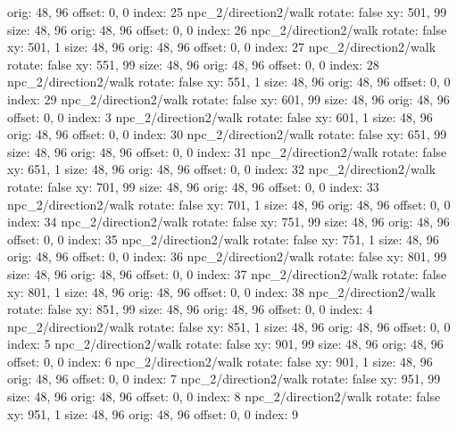   orig: 48, 96
  offset: 0, 0
  index: 25
npc_2/direction2/walk
  rotate: false
  xy: 501, 99
  size: 48, 96
  orig: 48, 96
  offset: 0, 0
  index: 26
npc_2/direction2/walk
  rotate: false
  xy: 501, 1
  size: 48, 96
  orig: 48, 96
  offset: 0, 0
  index: 27
npc_2/direction2/walk
  rotate: false
  xy: 551, 99
  size: 48, 96
  orig: 48, 96
  offset: 0, 0
  index: 28
npc_2/direction2/walk
  rotate: false
  xy: 551, 1
  size: 48, 96
  orig: 48, 96
  offset: 0, 0
  index: 29
npc_2/direction2/walk
  rotate: false
  xy: 601, 99
  size: 48, 96
  orig: 48, 96
  offset: 0, 0
  index: 3
npc_2/direction2/walk
  rotate: false
  xy: 601, 1
  size: 48, 96
  orig: 48, 96
  offset: 0, 0
  index: 30
npc_2/direction2/walk
  rotate: false
  xy: 651, 99
  size: 48, 96
  orig: 48, 96
  offset: 0, 0
  index: 31
npc_2/direction2/walk
  rotate: false
  xy: 651, 1
  size: 48, 96
  orig: 48, 96
  offset: 0, 0
  index: 32
npc_2/direction2/walk
  rotate: false
  xy: 701, 99
  size: 48, 96
  orig: 48, 96
  offset: 0, 0
  index: 33
npc_2/direction2/walk
  rotate: false
  xy: 701, 1
  size: 48, 96
  orig: 48, 96
  offset: 0, 0
  index: 34
npc_2/direction2/walk
  rotate: false
  xy: 751, 99
  size: 48, 96
  orig: 48, 96
  offset: 0, 0
  index: 35
npc_2/direction2/walk
  rotate: false
  xy: 751, 1
  size: 48, 96
  orig: 48, 96
  offset: 0, 0
  index: 36
npc_2/direction2/walk
  rotate: false
  xy: 801, 99
  size: 48, 96
  orig: 48, 96
  offset: 0, 0
  index: 37
npc_2/direction2/walk
  rotate: false
  xy: 801, 1
  size: 48, 96
  orig: 48, 96
  offset: 0, 0
  index: 38
npc_2/direction2/walk
  rotate: false
  xy: 851, 99
  size: 48, 96
  orig: 48, 96
  offset: 0, 0
  index: 4
npc_2/direction2/walk
  rotate: false
  xy: 851, 1
  size: 48, 96
  orig: 48, 96
  offset: 0, 0
  index: 5
npc_2/direction2/walk
  rotate: false
  xy: 901, 99
  size: 48, 96
  orig: 48, 96
  offset: 0, 0
  index: 6
npc_2/direction2/walk
  rotate: false
  xy: 901, 1
  size: 48, 96
  orig: 48, 96
  offset: 0, 0
  index: 7
npc_2/direction2/walk
  rotate: false
  xy: 951, 99
  size: 48, 96
  orig: 48, 96
  offset: 0, 0
  index: 8
npc_2/direction2/walk
  rotate: false
  xy: 951, 1
  size: 48, 96
  orig: 48, 96
  offset: 0, 0
  index: 9

